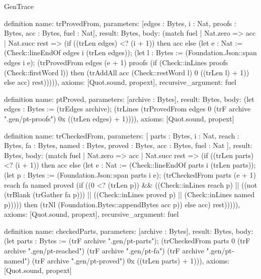 \begin{lexlean}{GenTrace}
\begin{semanticmodule}
definition{
  name: trProvedFrom,
  parameters: [edges : Bytes, i : Nat, proofs : Bytes, acc : Bytes, fuel : Nat],
  result: Bytes,
  body: (match fuel
    | Nat.zero => acc
    | Nat.succ rest => (if ((trLen edges) <? (i + 1)) then acc else (let e : Nat := (Check::lineEndOf edges i (trLen edges)); (let l : Bytes := (Foundation.Json::span edges i e); (trProvedFrom edges (e + 1) proofs (if (Check::inLines proofs (Check::firstWord l)) then (trAddAll acc (Check::restWord l) 0 ((trLen l) + 1)) else acc) rest))))),
  axioms: [Quot.sound, propext],
  recursive_argument: fuel
}

definition{
  name: ptProved,
  parameters: [archive : Bytes],
  result: Bytes,
  body: (let edges : Bytes := (trEdges archive); (trLines (trProvedFrom edges 0 (trF archive ".gen/pt-proofs") 0x ((trLen edges) + 1)))),
  axioms: [Quot.sound, propext]
}

definition{
  name: trCheckedFrom,
  parameters: [
    parts : Bytes,
    i : Nat,
    reach : Bytes,
    fa : Bytes,
    named : Bytes,
    proved : Bytes,
    acc : Bytes,
    fuel : Nat
  ],
  result: Bytes,
  body: (match fuel
    | Nat.zero => acc
    | Nat.succ rest => (if ((trLen parts) <? (i + 1)) then acc else (let e : Nat := (Check::lineEndOf parts i (trLen parts)); (let p : Bytes := (Foundation.Json::span parts i e); (trCheckedFrom parts (e + 1) reach fa named proved (if ((0 <? (trLen p)) && ((Check::inLines reach p) || ((not (trBlank (trGather fa p))) || ((Check::inLines proved p) || (Check::inLines named p))))) then (trNl (Foundation.Bytes::appendBytes acc p)) else acc) rest))))),
  axioms: [Quot.sound, propext],
  recursive_argument: fuel
}

definition{
  name: checkedParts,
  parameters: [archive : Bytes],
  result: Bytes,
  body: (let parts : Bytes := (trF archive ".gen/pt-parts"); (trCheckedFrom parts 0 (trF archive ".gen/pt-reached") (trF archive ".gen/pt-fa") (trF archive ".gen/pt-named") (trF archive ".gen/pt-proved") 0x ((trLen parts) + 1))),
  axioms: [Quot.sound, propext]
}
\end{semanticmodule}
\end{lexlean}
